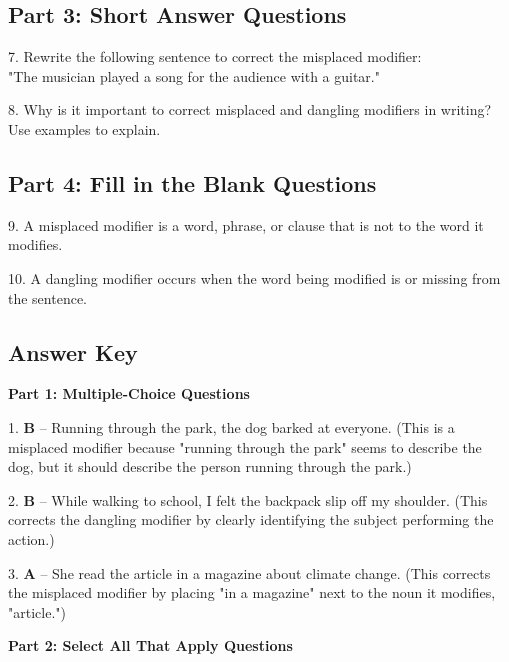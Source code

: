 \documentclass[12pt]{article}
\begin{document}
\vspace{1cm}
\newpage
\subsection*{Part 3: Short Answer Questions}

7. Rewrite the following sentence to correct the misplaced modifier: \\  
"The musician played a song for the audience with a guitar."  
\vspace{3cm}

8. Why is it important to correct misplaced and dangling modifiers in writing? Use examples to explain.  
\vspace{3cm}

\subsection*{Part 4: Fill in the Blank Questions}
\vspace{1cm}
9. A misplaced modifier is a word, phrase, or clause that is not \underline{\hspace{4cm}} to the word it modifies.  
\vspace{2cm}

10. A dangling modifier occurs when the word being modified is \underline{\hspace{4cm}} or missing from the sentence.  
\vspace{2cm}
\newpage
\subsection*{Answer Key}

\textbf{Part 1: Multiple-Choice Questions}

1. \textbf{B} – Running through the park, the dog barked at everyone. (This is a misplaced modifier because "running through the park" seems to describe the dog, but it should describe the person running through the park.)

2. \textbf{B} – While walking to school, I felt the backpack slip off my shoulder. (This corrects the dangling modifier by clearly identifying the subject performing the action.)

3. \textbf{A} – She read the article in a magazine about climate change. (This corrects the misplaced modifier by placing "in a magazine" next to the noun it modifies, "article.")

\textbf{Part 2: Select All That Apply Questions}
\end{document}
